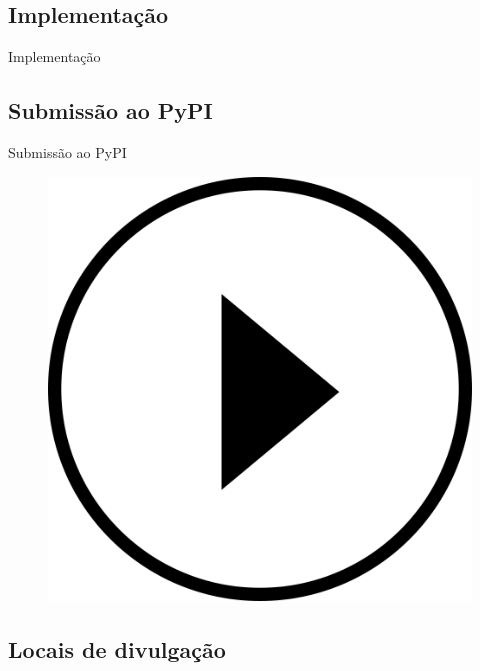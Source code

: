 \subsection{Implementação}
\label{ss.implementation}

\begin{frame}{Implementação}
\end{frame}

\subsection{Submissão ao PyPI}
\label{ss.pypi_submission}

\begin{frame}{Submissão ao PyPI}
\end{frame}

\begin{frame}{}
	\begin{figure}
		\centering
		\includegraphics[scale=0.125]{figs/video_play.png}
	\end{figure}
\end{frame}

\subsection{Locais de divulgação}
\label{ss.places_sharing}

